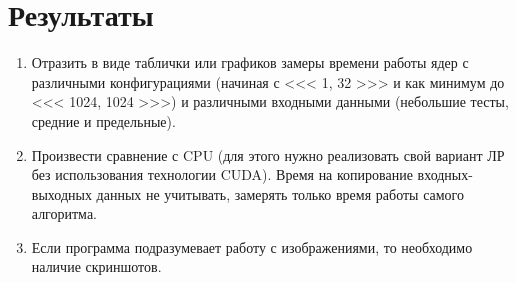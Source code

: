 \section{Результаты}
\begin{enumerate}[noitemsep, topsep=0pt]
	\item Отразить в виде таблички или графиков замеры времени работы ядер с различными конфигурациями (начиная с <{}<{}< 1, 32 >{}>{}> и как минимум до <{}<{}< 1024, 1024 >{}>{}>) и различными входными данными (небольшие тесты, средние и предельные). \\
	\item Произвести сравнение с CPU (для этого нужно реализовать свой вариант ЛР без использования технологии CUDA). Время на копирование входных-выходных данных не учитывать, замерять только время работы самого алгоритма. \\
	\item Если программа подразумевает работу с изображениями, то необходимо наличие скриншотов.
\end{enumerate}
